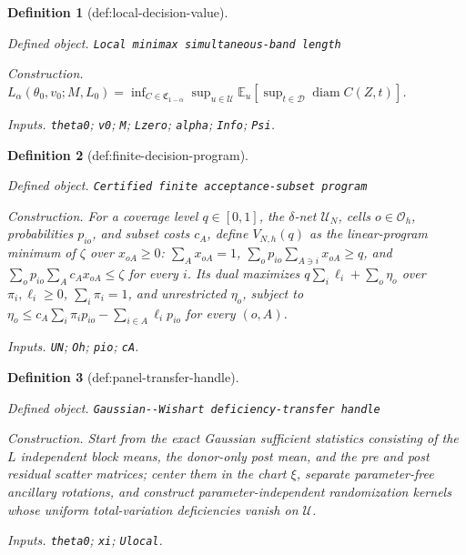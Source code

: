 \documentclass{article}
\newtheorem{definition}{Definition}
\begin{document}
\begin{definition}[def:local-decision-value]\label{def:local-decision-value}
\par\smallskip\noindent\emph{Defined object.} \texttt{Local minimax simultaneous-\allowbreak{}band length}
\par\smallskip\noindent\emph{Construction.} \(L_\alpha(\theta_0,v_0;M,L_0)=\inf_{C\in\mathfrak C_{1-\alpha}}\sup_{u\in\mathcal U}\mathbb E_u[\sup_{t\in\mathcal D}\operatorname{diam}C(Z,t)]\).
\par\smallskip\noindent\emph{Inputs.} \texttt{theta0}; \texttt{v0}; \texttt{M}; \texttt{Lzero}; \texttt{alpha}; \texttt{Info}; \texttt{Psi}.
\end{definition}

\begin{definition}[def:finite-decision-program]\label{def:finite-decision-program}
\par\smallskip\noindent\emph{Defined object.} \texttt{Certified finite acceptance-\allowbreak{}subset program}
\par\smallskip\noindent\emph{Construction.} For a coverage level \(q\in[0,1]\), the \(\delta\)-net \(\mathcal U_N\), cells \(o\in\mathcal O_h\), probabilities \(p_{io}\), and subset costs \(c_A\), define \(V_{N,h}(q)\) as the linear-program minimum of \(\zeta\) over \(x_{oA}\ge0\): \(\sum_Ax_{oA}=1\), \(\sum_op_{io}\sum_{A\ni i}x_{oA}\ge q\), and \(\sum_op_{io}\sum_Ac_Ax_{oA}\le\zeta\) for every \(i\). Its dual maximizes \(q\sum_i\ell_i+\sum_o\eta_o\) over \(\pi_i,\ell_i\ge0\), \(\sum_i\pi_i=1\), and unrestricted \(\eta_o\), subject to \(\eta_o\le c_A\sum_i\pi_ip_{io}-\sum_{i\in A}\ell_ip_{io}\) for every \((o,A)\).
\par\smallskip\noindent\emph{Inputs.} \texttt{UN}; \texttt{Oh}; \texttt{pio}; \texttt{cA}.
\end{definition}

\begin{definition}[def:panel-transfer-handle]\label{def:panel-transfer-handle}
\par\smallskip\noindent\emph{Defined object.} \texttt{Gaussian-\allowbreak{}-\allowbreak{}Wishart deficiency-\allowbreak{}transfer handle}
\par\smallskip\noindent\emph{Construction.} Start from the exact Gaussian sufficient statistics consisting of the \(L\) independent block means, the donor-only post mean, and the pre and post residual scatter matrices; center them in the chart \(\xi\), separate parameter-free ancillary rotations, and construct parameter-independent randomization kernels whose uniform total-variation deficiencies vanish on \(\mathcal U\).
\par\smallskip\noindent\emph{Inputs.} \texttt{theta0}; \texttt{xi}; \texttt{Ulocal}.
\end{definition}
\end{document}
